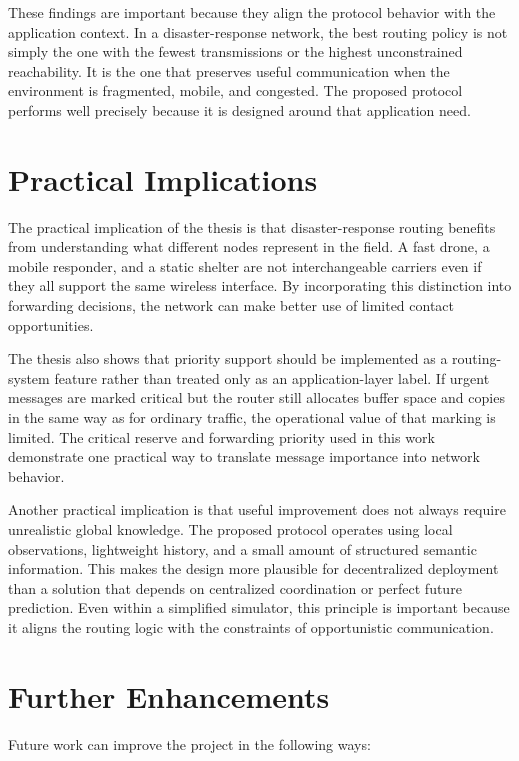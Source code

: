 These findings are important because they align the protocol behavior with the application context. In a disaster-response network, the best routing policy is not simply the one with the fewest transmissions or the highest unconstrained reachability. It is the one that preserves useful communication when the environment is fragmented, mobile, and congested. The proposed protocol performs well precisely because it is designed around that application need.

\section{Practical Implications}
The practical implication of the thesis is that disaster-response routing benefits from understanding what different nodes represent in the field. A fast drone, a mobile responder, and a static shelter are not interchangeable carriers even if they all support the same wireless interface. By incorporating this distinction into forwarding decisions, the network can make better use of limited contact opportunities.

The thesis also shows that priority support should be implemented as a routing-system feature rather than treated only as an application-layer label. If urgent messages are marked critical but the router still allocates buffer space and copies in the same way as for ordinary traffic, the operational value of that marking is limited. The critical reserve and forwarding priority used in this work demonstrate one practical way to translate message importance into network behavior.

Another practical implication is that useful improvement does not always require unrealistic global knowledge. The proposed protocol operates using local observations, lightweight history, and a small amount of structured semantic information. This makes the design more plausible for decentralized deployment than a solution that depends on centralized coordination or perfect future prediction. Even within a simplified simulator, this principle is important because it aligns the routing logic with the constraints of opportunistic communication.

\section{Further Enhancements}
Future work can improve the project in the following ways:


